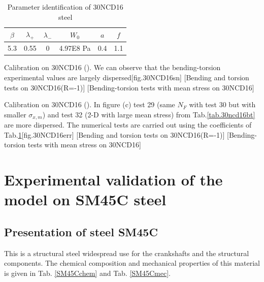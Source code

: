\begin{table}[!h]
\centering
\begin{tabular}{|c|c|c|c|c|c|}
	\hline
	\textbf{$\beta$} & \textbf{$\lambda_+$} & \textbf{$\lambda_-$} & \textbf{$W_0$} & \textbf{$a$}& \textbf{$f$}  \\ \hline
	5.3     & 0.55 &0         &4.97E8 Pa  & 0.4& 1.1   \\ \hline
\end{tabular}
\caption{Parameter identification of 30NCD16 steel}
\label{30ncdpara2}
\end{table}

\begin{Figure}[!h]{Calibration on  30NCD16 (\cite{Dubar1992}). We can observe that the bending-torsion experimental values are largely dispersed}[fig.30NCD16sn]
	[Bending and torsion tests on 30NCD16(R=-1)]
	[Bending-torsion tests with mean stress on 30NCD16]
\end{Figure}

\begin{Figure}[!h]{Calibration on  30NCD16 (\cite{Dubar1992}). In figure (c) test 29 (same $N_F$ with test 30 but with smaller $\sigma_{x,m}$) and test 32 (2-D with large mean stress) from Tab.\ref{tab.30ncd16bt} are more dispersed. The numerical tests are carried out using the coefficients of Tab.\ref{30ncdpara2}}[fig.30NCD16err]
[Bending and torsion tests on 30NCD16(R=-1)]
[Bending-torsion tests with mean stress on 30NCD16]
\end{Figure}


\clearpage
\section{Experimental validation of the model on SM45C steel}
\subsection{Presentation of steel SM45C}
This is a structural steel widespread use for the crankshafts and the structural components. The chemical composition and mechanical properties of this material is given in Tab. \ref{SM45Cchem} and Tab. \ref{SM45Cmec}.

